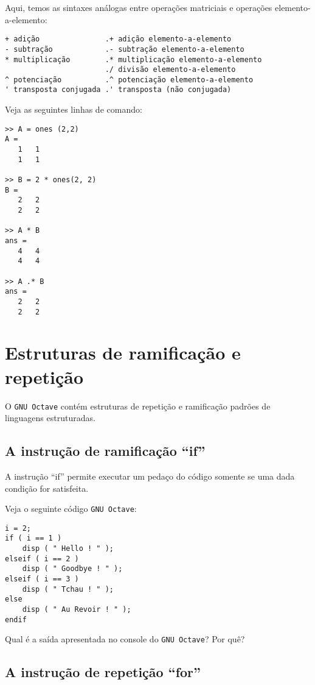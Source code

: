 Aqui, temos as sintaxes análogas entre operações matriciais e operações elemento-a-elemento:
\begin{verbatim}
+ adição               .+ adição elemento-a-elemento
- subtração            .- subtração elemento-a-elemento
* multiplicação        .* multiplicação elemento-a-elemento
                       ./ divisão elemento-a-elemento
^ potenciação          .^ potenciação elemento-a-elemento
' transposta conjugada .' transposta (não conjugada)
\end{verbatim}

\begin{ex}
  Veja as seguintes linhas de comando:
\begin{verbatim}
>> A = ones (2,2)
A =
   1   1
   1   1

>> B = 2 * ones(2, 2)
B =
   2   2
   2   2

>> A * B
ans =
   4   4
   4   4

>> A .* B
ans =
   2   2
   2   2
\end{verbatim}
\end{ex}

\section{Estruturas de ramificação e repetição}

O \verb+GNU Octave+ contém estruturas de repetição e ramificação padrões de linguagens estruturadas.

\subsection{A instrução de ramificação ``if''}

A instrução ``if'' permite executar um pedaço do código somente se uma dada condição for satisfeita.

\begin{ex}
  Veja o seguinte código \verb+GNU Octave+:
\begin{verbatim}
i = 2;
if ( i == 1 )
    disp ( " Hello ! " );
elseif ( i == 2 )
    disp ( " Goodbye ! " );
elseif ( i == 3 )
    disp ( " Tchau ! " );
else
    disp ( " Au Revoir ! " );
endif
\end{verbatim}
Qual é a saída apresentada no console do \verb+GNU Octave+? Por quê?
\end{ex}

\subsection{A instrução de repetição ``for''}

